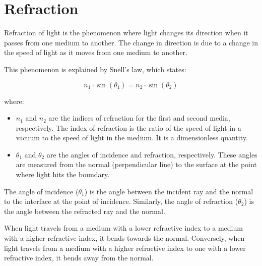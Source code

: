 \chapter{Refraction}


Refraction of light is the phenomenon where light changes its direction when it passes from one medium to another. The change in direction is due to a change in the speed of light as it moves from one medium to another. 

This phenomenon is explained by Snell's law, which states:

\begin{equation}
n_1 \cdot \sin(\theta_1) = n_2 \cdot \sin(\theta_2)
\end{equation}

where:
\begin{itemize}
\item $n_1$ and $n_2$ are the indices of refraction for the first and second media, respectively. The index of refraction is the ratio of the speed of light in a vacuum to the speed of light in the medium. It is a dimensionless quantity.
\item $\theta_1$ and $\theta_2$ are the angles of incidence and refraction, respectively. These angles are measured from the normal (perpendicular line) to the surface at the point where light hits the boundary.
\end{itemize}

The angle of incidence ($\theta_1$) is the angle between the incident ray and the normal to the interface at the point of incidence. Similarly, the angle of refraction ($\theta_2$) is the angle between the refracted ray and the normal.

When light travels from a medium with a lower refractive index to a medium with a higher refractive index, it bends towards the normal. Conversely, when light travels from a medium with a higher refractive index to one with a lower refractive index, it bends away from the normal.
